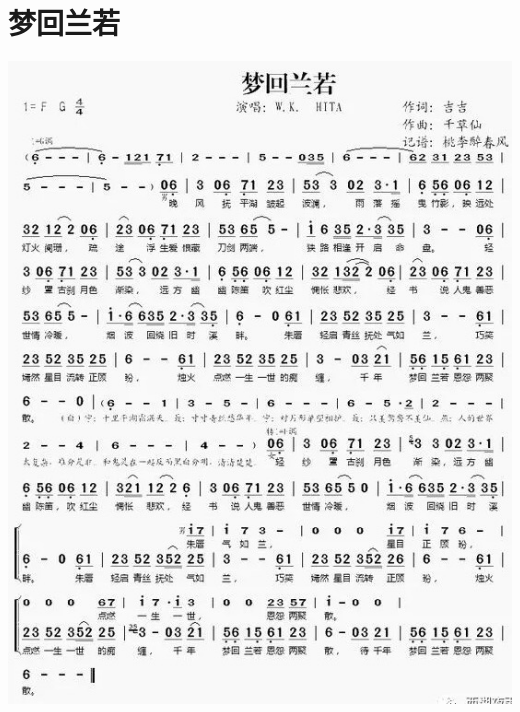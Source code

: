 \documentclass[cn,pad,twocol]{elegantbook}
\begin{document}
\section{梦回兰若}\includegraphics[width=\textwidth]{dongxiao/20200819/梦回兰若.jpeg}
\end{document}
